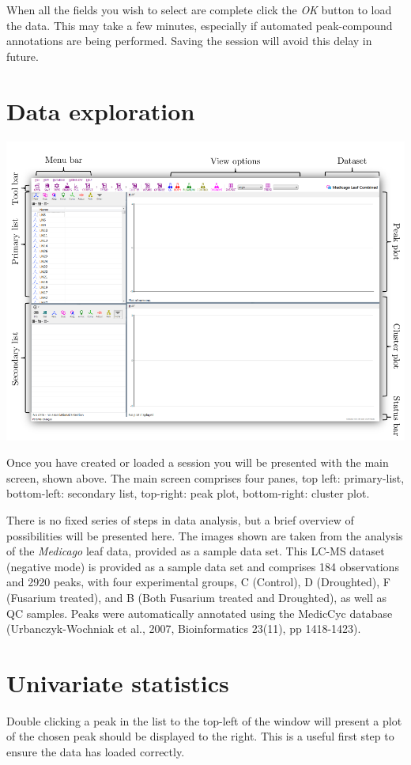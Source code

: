 \documentclass[11pt,a4paper]{article}
\newcommand{\menu}[1]{ \flqq\textit{#1}\frqq}
\begin{document}
When all the fields you wish to select are complete click the \menu{OK} button to load the data. This may take a few minutes, especially if automated peak-compound annotations are being performed. Saving the session will avoid this delay in future.

\section{Data exploration}
\begin{center}
	\includegraphics[max width=0.7\linewidth]{"Images/userguide/main screen"}
\end{center}
Once you have created or loaded a session you will be presented with the main screen, shown above. The main screen comprises four panes, top left: primary-list, bottom-left: secondary list, top-right: peak plot, bottom-right: cluster plot.

There is no fixed series of steps in data analysis, but a brief overview of possibilities will be presented here. The images shown are taken from the analysis of the \textit{Medicago} leaf data, provided as a sample data set. This LC-MS dataset (negative mode) is provided as a sample data set and comprises 184 observations and 2920 peaks, with four experimental groups, C (Control), D (Droughted), F (Fusarium treated), and B (Both Fusarium treated and Droughted), as well as QC samples. Peaks were automatically annotated using the MedicCyc database (Urbanczyk-Wochniak et al., 2007, Bioinformatics 23(11), pp 1418-1423).

\section{Univariate statistics}
\label{section:ug_univariate}
Double clicking a peak in the list to the top-left of the window will present a plot of the chosen peak should be displayed to the right. This is a useful first step to ensure the data has loaded correctly.
\end{document}
